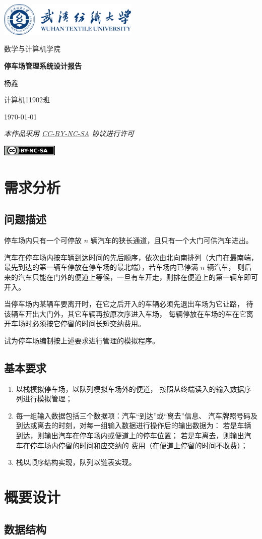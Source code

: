 \documentclass{ctexart}
\newcommand{\makecover}[4]{
    \begin{titlepage}
        \centering
        \includegraphics[width=0.5\textwidth]{logo.png}\par
        \vspace{1cm}
        {\kaishu\ziju{0.1}\Huge 数学与计算机学院}\par
        \vspace{5.5cm}
        {\bfseries\ziju{0.1}\zihao{-0} #1}\par
        \vspace{5.5cm}
        {\kaishu\ziju{0.1}\Huge #2}\par
        \vspace{0.7cm}
        {\kaishu\Large #3}\par
        \vspace{1em}
        {\kaishu\large #4}\par
        \vspace{4em}
        {\itshape 本作品采用 \href{https://creativecommons.org/licenses/by-nc-sa/4.0/}{CC-BY-NC-SA} 协议进行许可}\par
        \vspace{1em}
        \includegraphics[width=0.2\textwidth]{cc-by-nc-sa.png}
    \end{titlepage}
}
\begin{document}
    \makecover{停车场管理系统设计报告}{杨鑫}{计算机11902班}{\today}
    
    \section{需求分析}

    \subsection{问题描述}
    停车场内只有一个可停放 $n$ 辆汽车的狭长通道，且只有一个大门可供汽车进出。
    
    汽车在停车场内按车辆到达时间的先后顺序，依次由北向南排列（大门在最南端，
    最先到达的第一辆车停放在停车场的最北端），若车场内已停满 $n$ 辆汽车，
    则后来的汽车只能在门外的便道上等候，一旦有车开走，则排在便道上的第一辆车即可开入。

    当停车场内某辆车要离开时，在它之后开入的车辆必须先退出车场为它让路，
    待该辆车开出大门外，其它车辆再按原次序进入车场，
    每辆停放在车场的车在它离开车场时必须按它停留的时间长短交纳费用。
    
    试为停车场编制按上述要求进行管理的模拟程序。
    
    \subsection{基本要求}
    \begin{enumerate}[\indent (1)]
        \item 以栈模拟停车场，以队列模拟车场外的便道，
              按照从终端读入的输入数据序列进行模拟管理；
        \item 每一组输入数据包括三个数据项：汽车“到达”或“离去”信息、
              汽车牌照号码及到达或离去的时刻，对每一组输入数据进行操作后的输出数据为：
              若是车辆到达，则输出汽车在停车场内或便道上的停车位置；
              若是车离去，则输出汽车在停车场内停留的时间和应交纳的
              费用（在便道上停留的时间不收费）；
        \item 栈以顺序结构实现，队列以链表实现。
    \end{enumerate}
    
    \section{概要设计}

    \subsection{数据结构}
\end{document}
